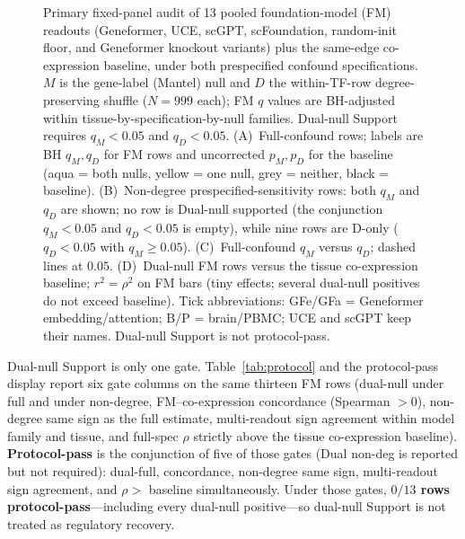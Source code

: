 \documentclass[fleqn,10pt,lineno]{wlpeerj}
\newcommand{\fitfig}[1]{\resizebox{\ifdim\width>\linewidth\linewidth\else\width\fi}{!}{#1}}
\begin{document}
\begin{figure}[!tbp]\centering
\fitfig{}
\caption{Primary fixed-panel audit of 13 pooled foundation-model (FM) readouts
(Geneformer, UCE, scGPT, scFoundation, random-init floor, and Geneformer knockout variants)
plus the same-edge co-expression baseline, under both prespecified confound specifications.
$M$ is the gene-label (Mantel) null and $D$ the within-TF-row degree-preserving shuffle
($N=999$ each); FM $q$ values are BH-adjusted within tissue-by-specification-by-null families.
Dual-null Support requires $q_M<0.05$ and $q_D<0.05$. (A)~Full-confound rows; labels are BH
$q_M,q_D$ for FM rows and uncorrected $p_M,p_D$ for the baseline (aqua = both nulls, yellow =
one null, grey = neither, black = baseline). (B)~Non-degree prespecified-sensitivity rows: both $q_M$ and $q_D$
are shown; no row is Dual-null supported (the conjunction $q_M<0.05$ and $q_D<0.05$ is empty),
while nine rows are D-only ($q_D<0.05$ with $q_M\ge0.05$). (C)~Full-confound
$q_M$ versus $q_D$; dashed lines at $0.05$. (D)~Dual-null FM
rows versus the tissue co-expression baseline; $r^{2}=\rho^{2}$ on FM bars (tiny effects;
several dual-null positives do not exceed baseline). Tick abbreviations:
GFe/GFa = Geneformer embedding/attention; B/P = brain/PBMC; UCE and scGPT keep their names.
Dual-null Support is not protocol-pass.}
\label{fig:primary}
\end{figure}

\begin{table}[H]\centering
\fitfig{}
\caption{Primary fixed-panel results under the \emph{full} confound specification only (13
FM/readout rows plus the same-edge co-expression baseline). Partial Spearman $\rho$ is alignment
of each graph with the accessibility/motif proxy. $M$ denotes the gene-label null and $D$ the
within-TF-row degree-preserving target shuffle ($N=999$ each); each $q$ is BH-adjusted within its
tissue-by-specification-by-null family. Support is dual within-family BH $q_M<0.05$ and
$q_D<0.05$ (``both''); opposite-sign dual support is labeled ``both (neg)''; ``neither'' otherwise.
The co-expression baseline is tested on the same edge set outside the FM families and is marked
``--'' in Support; its entries are uncorrected $p$-values (dashes mark where no family correction
applies). Dual-null Support is not protocol-pass.}\label{tab:primary}
\end{table}

Dual-null Support is only one gate. Table~\ref{tab:protocol} and
the protocol-pass display report six gate columns on the same thirteen FM rows
(dual-null under full and under non-degree, FM--co-expression concordance
(Spearman $>0$), non-degree same sign as the full estimate, multi-readout sign agreement within
model family and tissue, and full-spec $\rho$ strictly above the tissue co-expression baseline).
\textbf{Protocol-pass} is the conjunction of five of those gates (Dual non-deg is reported but
not required): dual-full, concordance, non-degree same sign, multi-readout sign
agreement, and $\rho>$ baseline simultaneously. Under those gates,
\textbf{$0/13$ rows protocol-pass}---including every dual-null positive---so dual-null Support is not
treated as regulatory recovery.
\end{document}
